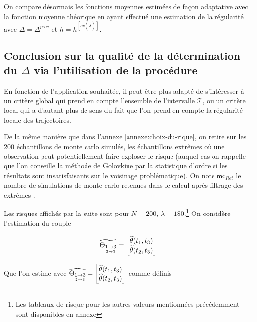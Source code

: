 On compare désormais les fonctions moyennes estimées de façon adaptative avec la fonction moyenne théorique en ayant effectué une estimation de la régularité avec $\Delta = \Delta^{proc}$ et $h = h^{[cv(\widehat \lambda)]}$.


\subsection{Conclusion sur la qualité de la détermination du $\Delta$ via l'utilisation de la procédure}

En fonction de l'application souhaitée, il peut être plus adapté de s'intéresser à un critère global qui prend en compte l'ensemble de l'intervalle $\mathcal T$, ou un critère local qui a d'autant plus de sens du fait que l'on prend en compte la régularité locale des trajectoires.

\bigskip

\noindent De la même manière que dans l'annexe \ref{annexe:choix-du-rique}, on retire sur les 200 échantillons de monte carlo simulés, les échantillons \og extrêmes \fg où une observation peut potentiellement faire exploser le risque (auquel cas on rappelle que l'on conseille la méthode de Golovkine par la statistique d'ordre si les résultats sont insatisfaisants sur le voisinage problématique). On note $\textsf{mc}_{Ret}$ le nombre de simulations de monte carlo retenues dans le calcul après filtrage des \og extrêmes \fg.

\bigskip

\noindent Les risques affichés par la suite sont pour $N=200$, $\lambda = 180$.\footnote{Les tableaux de risque pour les autres valeurs mentionnées précédemment sont disponibles en annexe} On considère l'estimation du couple 

\begin{minipage}{0.45\textwidth}
\begin{equation*}
\widetilde {\Theta_{\underset{2 \rightarrow 3}{1 \rightarrow 3}}} = \begin{bmatrix} \widetilde \theta(t_1, t_3)\\ \widetilde \theta(t_2, t_3) \end{bmatrix}
\end{equation*}
\end{minipage}
\begin{minipage}{0.45\textwidth}
Que l'on estime avec $\widehat {\Theta_{\underset{2 \rightarrow 3}{1 \rightarrow 3}}} = \begin{bmatrix} \widehat \theta(t_1, t_3)\\ \widehat \theta(t_2, t_3) \end{bmatrix}$ comme définis 
\end{minipage}

